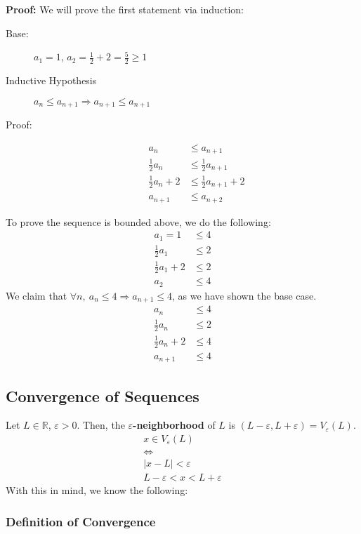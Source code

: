\documentclass[10pt]{extarticle}
\newcommand{\R}{\mathbb{R}}
\begin{document}
    \textbf{Proof:} We will prove the first statement via induction:
    \begin{description}
      \item[Base:] $a_1 = 1$, $a_2 = \frac{1}{2} + 2 = \frac{5}{2} \geq 1$
      \item[Inductive Hypothesis] $a_n \leq a_{n+1} \Rightarrow a_{n+1} \leq a_{n+1}$
      \item[Proof:]
        \begin{align*}
          a_{n} &\leq a_{n+1}\\
          \frac{1}{2}a_n &\leq \frac{1}{2}a_{n+1}\\
          \frac{1}{2}a_n + 2 &\leq \frac{1}{2}a_{n+1} + 2\\
          a_{n+1} &\leq a_{n+2}
        \end{align*}
    \end{description}
    To prove the sequence is bounded above, we do the following:
    \begin{align*}
      a_1 = 1 &\leq 4\\
      \frac{1}{2}a_1 &\leq 2\\
      \frac{1}{2}a_1 + 2 &\leq 2\\
      a_{2} &\leq 4
    \end{align*}
    We claim that $\forall n,~a_n \leq 4 \Rightarrow a_{n+1} \leq 4$, as we have shown the base case.
    \begin{align*}
      a_{n} &\leq 4\\
      \frac{1}{2}a_n &\leq 2\\
      \frac{1}{2}a_n + 2 &\leq 4\\
      a_{n+1} &\leq 4
    \end{align*}
  \subsection{Convergence of Sequences}%
    Let $L\in\R$, $\varepsilon > 0$. Then, the $\varepsilon$\textbf{-neighborhood} of $L$ is $(L-\varepsilon, L+\varepsilon) = V_{\varepsilon}(L)$.
    \begin{align*}
      x\in V_{\varepsilon}(L)\\
      \Leftrightarrow\\
      |x-L| < \varepsilon\\
      L-\varepsilon < x < L+\varepsilon
    \end{align*}
    With this in mind, we know the following:
    \subsubsection{Definition of Convergence}%
    
\end{document}
